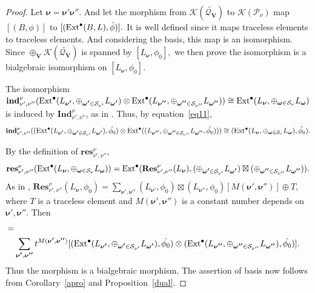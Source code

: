 \documentclass[10pt,a4paper]{amsart}
\def\Ext{\mbox{\rm Ext}}   \def\Ker{\mbox{\rm Ker}\,}
\def\bfV{{\mathbf V}}
\def\bfV{\mathbf{V}}
\def\Ind{\mathbf{Ind}}
\def\Res{\mathbf{Res}}
\def\ind{\mathbf{ind}}
\def\res{\mathbf{res}}
\newcommand\mk{{\mathcal{K}}}
\newcommand\mq{{\mathcal{Q}}}
\begin{document}
\begin{proof}
   Let $\boldsymbol{\nu}=\boldsymbol{\nu'\nu''}.$
   And let the morphism from  $\mk(\widetilde{\mq_{\bfV}})$ to $\mathcal{K}(\mathcal{P}_{\nu})$ map $[(B,\phi)]$ to $[(\Ext^{\bullet}(B,L),\hat{\phi})].$ It is well defined since it maps traceless elements to traceless elements. And considering the basis, this map is an isomorphism. Since $\oplus_{\bfV}\mk(\widetilde{\mq_{\bfV}})$ is spanned by $[L_{\boldsymbol{\nu}},\phi_0],$ we then prove the isomorphism is a bialgebraic isomorphism on $[L_{\boldsymbol{\nu}},\phi_0].$
   
   The isomorphism
    $\ind_{\nu',\nu''}^{\nu}(\Ext^{\bullet}(L_{\boldsymbol{\nu'}},\oplus_{\boldsymbol{\omega'}\in \mathcal{S}_{\nu'}}L_{\boldsymbol{\omega'}})\otimes \Ext^{\bullet}(L_{\boldsymbol{\nu''}},\oplus_{\boldsymbol{\omega''}\in \mathcal{S}_{\nu''}}L_{\boldsymbol{\omega''}}))\cong \Ext^{\bullet}(L_{\boldsymbol{\nu}},\oplus_{\boldsymbol{\omega}\in \mathcal{S}_{\nu}}L_{\boldsymbol{\omega}})$ is induced by $\Ind_{\nu',\nu''}^{\nu}$, as in \cite[Remark 4.8]{VaragnoloVasserot+2011+67+100}. Thus, by equation~\ref{eq11},
    $$\ind_{\nu',\nu''}^{\nu}((\Ext^{\bullet}(L_{\boldsymbol{\nu'}},\oplus_{\boldsymbol{\omega'}\in \mathcal{S}_{\nu'}}L_{\boldsymbol{\omega'}}),\hat{\phi_0})\otimes \Ext^{\bullet}((L_{\boldsymbol{\nu''}},\oplus_{\boldsymbol{\omega''}\in \mathcal{S}_{\nu''}}L_{\boldsymbol{\omega''}},\hat{\phi_0})))\cong (\Ext^{\bullet}(L_{\boldsymbol{\nu}},\oplus_{\boldsymbol{\omega}\in \mathcal{S}_{\nu}}L_{\boldsymbol{\omega}}),\hat{\phi_0}).$$

    By the definition of $\res_{\nu',\nu''}^{\nu},$ $$\res_{\nu',\nu''}^{\nu}(\Ext^{\bullet}(L_{\boldsymbol{\nu}},\oplus_{\boldsymbol{\omega}\in \mathcal{S}_{\nu}}L_{\boldsymbol{\omega}}))=\Ext^{\bullet}(\Res_{\nu',\nu''}^{\nu}(L_{\boldsymbol{\nu}}),(\oplus_{\boldsymbol{\omega'}\in \mathcal{S}_{\nu'}}L_{\boldsymbol{\omega'}})\boxtimes(\oplus_{\boldsymbol{\omega''}\in \mathcal{S}_{\nu''}}L_{\boldsymbol{\omega''}})).$$ As in \cite[Lemma 12.3.3]{lusztig2010introduction}, $\Res_{\nu',\nu''}^{\nu}(L_{\boldsymbol{\nu}},\phi_0)=\sum_{\boldsymbol{\nu'},\boldsymbol{\nu''}}(L_{\boldsymbol{\nu'}},\phi_0)\boxtimes (L_{\boldsymbol{\nu''}},\phi_0)[M(\boldsymbol{\nu'},\boldsymbol{\nu''})]\oplus T,$ where $T$ is a traceless element and $M(\boldsymbol{\nu'},\boldsymbol{\nu''})$ is a constant number depends on $\boldsymbol{\nu'},\boldsymbol{\nu''}.$ Then \begin{align*}
        [&\res_{\nu',\nu''}^{\nu}(\Ext^{\bullet}(L_{\boldsymbol{\nu}},\oplus_{\boldsymbol{\omega}\in \mathcal{S}_{\nu}}L_{\boldsymbol{\omega}}),\hat{\phi_0})]=\\&\sum_{\boldsymbol{\nu'},\boldsymbol{\nu''}}t^{M(\boldsymbol{\nu'},\boldsymbol{\nu''})}[(\Ext^{\bullet}(L_{\boldsymbol{\nu'}},\oplus_{\boldsymbol{\omega'}\in \mathcal{S}_{\nu'}}L_{\boldsymbol{\omega'}}),\hat{\phi_0})\otimes (\Ext^{\bullet}(L_{\boldsymbol{\nu''}},\oplus_{\boldsymbol{\omega''}\in \mathcal{S}_{\nu''}}L_{\boldsymbol{\omega''}}),\hat{\phi_0})].
    \end{align*}  Thus the morphism is a bialgebraic morphism.
    The assertion of basis now follows from Corollary~\ref{apro} and Proposition~\ref{dual}.
\end{proof}
\end{document}
